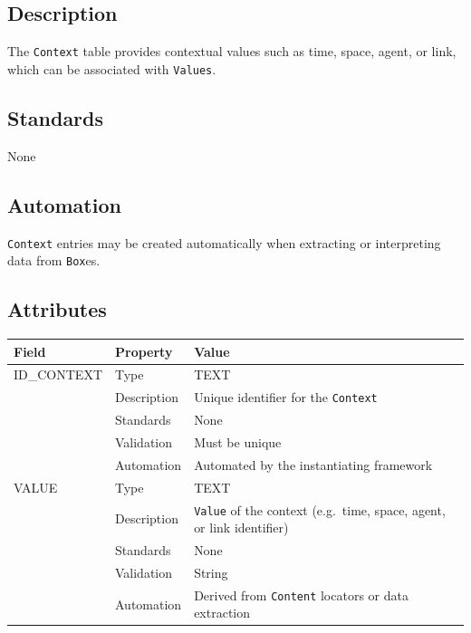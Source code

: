 \documentclass[
]{article}
\newcounter{none}
\begin{document}
\subsection{Description}\label{description-8}

The \texttt{Context} table provides contextual values such as time,
space, agent, or link, which can be associated with \texttt{Values}.

\subsection{Standards}\label{standards-10}

None

\subsection{Automation}\label{automation-10}

\texttt{Context} entries may be created automatically when extracting or
interpreting data from \texttt{Box}es.

\subsection{Attributes}\label{attributes-10}

{\def\LTcaptype{none} 
\begin{longtable}[]{@{}
  >{\raggedright\arraybackslash}p{}
  >{\raggedright\arraybackslash}p{}
  >{\raggedright\arraybackslash}p{}@{}}
\toprule\noalign{}
\begin{minipage}[b]{\linewidth}\raggedright
Field
\end{minipage} & \begin{minipage}[b]{\linewidth}\raggedright
Property
\end{minipage} & \begin{minipage}[b]{\linewidth}\raggedright
Value
\end{minipage} \\
\midrule\noalign{}
\endhead
\bottomrule\noalign{}
\endlastfoot
ID\_CONTEXT & Type & TEXT \\
& Description & Unique identifier for the \texttt{Context} \\
& Standards & None \\
& Validation & Must be unique \\
& Automation & Automated by the instantiating framework \\
VALUE & Type & TEXT \\
& Description & \texttt{Value} of the context (e.g.~time, space, agent,
or link identifier) \\
& Standards & None \\
& Validation & String \\
& Automation & Derived from \texttt{Content} locators or data
extraction \\
\end{longtable}
}
\end{document}
